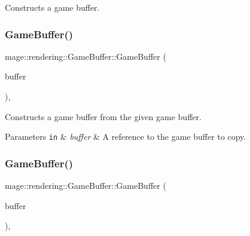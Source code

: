 Constructs a game buffer. \hypertarget{structmage_1_1rendering_1_1_game_buffer_ad7cd514cc0c422bce555f8435a06d7d0}{}\label{structmage_1_1rendering_1_1_game_buffer_ad7cd514cc0c422bce555f8435a06d7d0} 
\subsubsection{\texorpdfstring{Game\+Buffer()}{GameBuffer()}\hspace{0.1cm}{\footnotesize\ttfamily [2/3]}}
{\footnotesize\ttfamily mage\+::rendering\+::\+Game\+Buffer\+::\+Game\+Buffer (\begin{DoxyParamCaption}\item[{const \hyperlink{structmage_1_1rendering_1_1_game_buffer}{Game\+Buffer} \&}]{buffer }\end{DoxyParamCaption})\hspace{0.3cm}{\ttfamily [default]}, {\ttfamily [noexcept]}}

Constructs a game buffer from the given game buffer.


\begin{DoxyParams}[1]{Parameters}
\mbox{\tt in}  & {\em buffer} & A reference to the game buffer to copy. \\
\hline
\end{DoxyParams}
\hypertarget{structmage_1_1rendering_1_1_game_buffer_a4f151da7c4b17426f9293d72f3621583}{}\label{structmage_1_1rendering_1_1_game_buffer_a4f151da7c4b17426f9293d72f3621583} 
\subsubsection{\texorpdfstring{Game\+Buffer()}{GameBuffer()}\hspace{0.1cm}{\footnotesize\ttfamily [3/3]}}
{\footnotesize\ttfamily mage\+::rendering\+::\+Game\+Buffer\+::\+Game\+Buffer (\begin{DoxyParamCaption}\item[{\hyperlink{structmage_1_1rendering_1_1_game_buffer}{Game\+Buffer} \&\&}]{buffer }\end{DoxyParamCaption})\hspace{0.3cm}{\ttfamily [default]}, {\ttfamily [noexcept]}}

